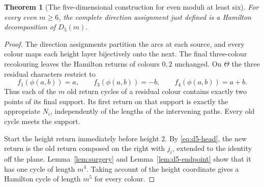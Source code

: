 \documentclass[11pt,reqno]{amsart}
\numberwithin{equation}{section}
\newtheorem{theorem}{Theorem}[section]
\theoremstyle{definition}
\theoremstyle{remark}
\begin{document}
\begin{theorem}[The five-dimensional construction for even moduli at least six]\label{thm:d5large}
For every even $m\ge6$, the complete direction assignment just defined is a Hamilton
decomposition of $D_5(m)$.
\end{theorem}
\begin{proof}
The direction assignments partition the arcs at each source, and every
colour maps each height layer bijectively onto the next. The final
three-colour recolouring leaves the Hamilton returns of colours $0,2$
unchanged. On $\Theta$ the three residual characters restrict to
\[
 f_1(\phi(a,b))=a,\qquad
 f_3(\phi(a,b))=-b,\qquad f_4(\phi(a,b))=a+b.
\]
Thus each of the $m$ old return cycles of a residual colour contains exactly two
points of its final support. Its first return on that support is exactly the
appropriate $N_i$, independently of the lengths of the intervening paths.
Every old cycle meets the support.

Start the height return immediately before height $2$. By
\eqref{eq:d5-head}, the new return is the old return composed on the right with
$j_i$, extended to the identity off the plane. Lemma~\ref{lem:surgery} and
Lemma~\ref{lem:d5-endpoint} show that it has one cycle of length $m^4$.
Taking account of the height coordinate gives a Hamilton cycle of length $m^5$
for every colour.
\end{proof}
\end{document}
